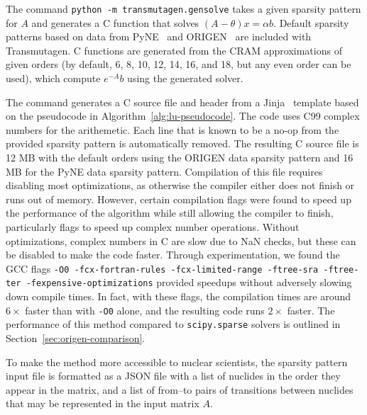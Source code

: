 The command \texttt{python -m transmutagen.gensolve} takes a given sparsity
pattern for $A$ and generates a C function that solves $(A - \theta)x =\alpha
b$. Default sparsity patterns based on data from PyNE~\cite{ationneeded} and
ORIGEN~\cite{ationneeded} are included with Transmutagen. C functions are
generated from the CRAM approximations of given orders (by default, 6, 8, 10,
12, 14, 16, and 18, but any even order can be used), which compute $e^{-A}b$
using the generated solver.

The command generates a C source file and header from a
Jinja~\cite{ationneeded} template based on the pseudocode in
Algorithm~\ref{alg:lu-pseudocode}. The code uses C99 complex numbers for the
arithemetic. Each line that is known to be a no-op from the provided sparsity
pattern is automatically removed. The resulting C source file is 12 MB with
the default orders using the ORIGEN data sparsity pattern and 16 MB for the
PyNE data sparsity pattern. Compilation of this file requires disabling most
optimizations, as otherwise the compiler either does not finish or runs out of
memory. However, certain compilation flags were found to speed up the
performance of the algorithm while still allowing the compiler to finish,
particularly flags to speed up complex number operations. Without
optimizations, complex numbers in C are slow due to NaN checks, but these can
be disabled to make the code faster.  Through experimentation, we found the GCC flags \texttt{-O0
-fcx-fortran-rules -fcx-limited-range -ftree-sra -ftree-ter
-fexpensive-optimizations} provided speedups without adversely slowing down
compile times. In fact, with these flags, the compilation times are around
$6\times$ faster than with \texttt{-O0} alone, and the resulting code runs
$2\times$ faster. The performance of this method compared to
\texttt{scipy.\allowbreak{}sparse} solvers is outlined in
Section~\ref{sec:origen-comparison}.

To make the method more accessible to nuclear scientists, the sparsity pattern
input file is formatted as a JSON file with a list of nuclides in the order
they appear in the matrix, and a list of from--to pairs of transitions between
nuclides that may be represented in the input matrix $A$.
